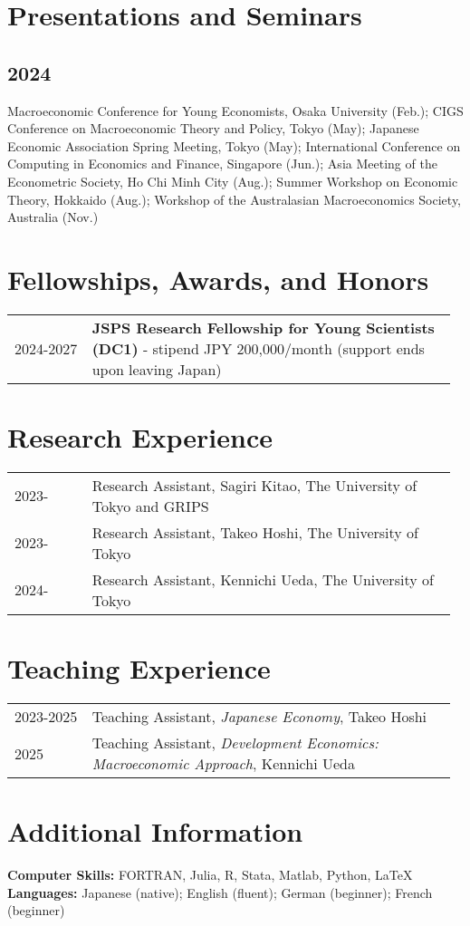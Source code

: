 \documentclass[11pt]{article}
\begin{document}
\section*{Presentations and Seminars}
\subsection*{2024}
Macroeconomic Conference for Young Economists, Osaka University (Feb.); 
CIGS Conference on Macroeconomic Theory and Policy, Tokyo (May); 
Japanese Economic Association Spring Meeting, Tokyo (May); 
International Conference on Computing in Economics and Finance, Singapore (Jun.); 
Asia Meeting of the Econometric Society, Ho Chi Minh City (Aug.); 
Summer Workshop on Economic Theory, Hokkaido (Aug.); 
Workshop of the Australasian Macroeconomics Society, Australia (Nov.)

\section*{Fellowships, Awards, and Honors}
\begin{tabular}{p{0.17\linewidth} p{0.80\linewidth}}
2024-2027 & \textbf{JSPS Research Fellowship for Young Scientists (DC1)} - stipend JPY 200,000/month (support ends upon leaving Japan)\\
\end{tabular}

\section*{Research Experience}
\begin{tabular}{p{0.17\linewidth} p{0.80\linewidth}}
2023- & Research Assistant, Sagiri Kitao, The University of Tokyo and GRIPS\\[2pt]
2023- & Research Assistant, Takeo Hoshi, The University of Tokyo\\[2pt]
2024- & Research Assistant, Kennichi Ueda, The University of Tokyo\\[2pt]
\end{tabular}

\section*{Teaching Experience}
\begin{tabular}{p{0.17\linewidth} p{0.80\linewidth}}
2023-2025 & Teaching Assistant, \textit{Japanese Economy}, Takeo Hoshi\\[2pt]
2025      & Teaching Assistant, \textit{Development Economics: Macroeconomic Approach}, Kennichi Ueda\\[2pt]
\end{tabular}

\section*{Additional Information}
\textbf{Computer Skills:} FORTRAN, Julia, R, Stata, Matlab, Python, \LaTeX\newline
\textbf{Languages:} Japanese (native); English (fluent); German (beginner); French (beginner)
\end{document}
